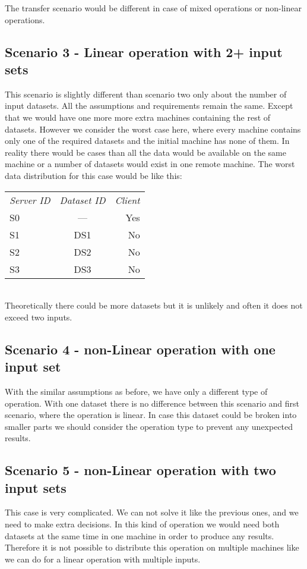The transfer scenario would be different in case of mixed operations or non-linear operations.


\subsection{Scenario 3 - Linear operation with 2+ input sets}
\label{sc:sc3}
This scenario is slightly different than scenario two only about the number of input datasets. All the assumptions and 
requirements remain the same. Except that we would have one more more extra machines containing the rest of datasets.
However we consider the worst case here, where every machine contains only one of the required datasets and the initial 
machine has none of them.
In reality there would be cases than all the data would be available on the same machine or a number of datasets
would exist in one remote machine. The worst data distribution for this case would be like this:
\\
\begin{tabular}{ l c r }
\em{Server ID} & \em{ Dataset ID} & \em{ Client} \\
S0 & --- & Yes \\
S1 & DS1 & No \\
S2 & DS2 & No \\
S3 & DS3 & No \\
\end{tabular}\\

Theoretically there could be more datasets but it is unlikely and often it does not exceed two inputs.


\subsection{Scenario 4 - non-Linear operation with one input set}
With the similar assumptions as before, we have only a different type of operation. With one dataset there is no 
difference between this scenario and first scenario, where the operation is linear. In case this dataset could
be broken into smaller parts we should consider the operation type to prevent any unexpected results.

\subsection{Scenario 5 - non-Linear operation with two input sets}
This case is very complicated. We can not solve it like the previous ones, and we need to make extra decisions.
In this kind of operation we would need both datasets at the same time in one machine in order to produce any
results. Therefore it is not possible to distribute this operation on multiple machines like we can do for 
a linear operation with multiple inputs. 

